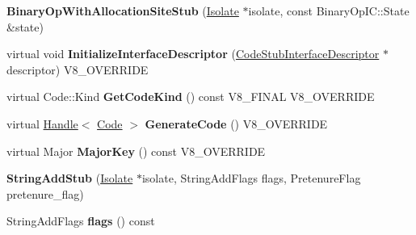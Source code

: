 \begin{DoxyCompactItemize}
\item 
\hypertarget{classv8_1_1internal_1_1_v8___f_i_n_a_l_af99197dd75c9312e4233a4390ea899fe}{}{\bfseries Binary\+Op\+With\+Allocation\+Site\+Stub} (\hyperlink{classv8_1_1internal_1_1_isolate}{Isolate} $\ast$isolate, const Binary\+Op\+I\+C\+::\+State \&state)\label{classv8_1_1internal_1_1_v8___f_i_n_a_l_af99197dd75c9312e4233a4390ea899fe}

\item 
\hypertarget{classv8_1_1internal_1_1_v8___f_i_n_a_l_aedb89fb967acc9802a2789257d456f13}{}virtual void {\bfseries Initialize\+Interface\+Descriptor} (\hyperlink{classv8_1_1internal_1_1_code_stub_interface_descriptor}{Code\+Stub\+Interface\+Descriptor} $\ast$descriptor) V8\+\_\+\+O\+V\+E\+R\+R\+I\+D\+E\label{classv8_1_1internal_1_1_v8___f_i_n_a_l_aedb89fb967acc9802a2789257d456f13}

\item 
\hypertarget{classv8_1_1internal_1_1_v8___f_i_n_a_l_ad00c36d4d9cb97213ceffe5f530c9e08}{}virtual Code\+::\+Kind {\bfseries Get\+Code\+Kind} () const V8\+\_\+\+F\+I\+N\+A\+L V8\+\_\+\+O\+V\+E\+R\+R\+I\+D\+E\label{classv8_1_1internal_1_1_v8___f_i_n_a_l_ad00c36d4d9cb97213ceffe5f530c9e08}

\item 
\hypertarget{classv8_1_1internal_1_1_v8___f_i_n_a_l_a0ed5719f94df27f3b0c610b0a4934a70}{}virtual \hyperlink{classv8_1_1internal_1_1_handle}{Handle}$<$ \hyperlink{classv8_1_1internal_1_1_code}{Code} $>$ {\bfseries Generate\+Code} () V8\+\_\+\+O\+V\+E\+R\+R\+I\+D\+E\label{classv8_1_1internal_1_1_v8___f_i_n_a_l_a0ed5719f94df27f3b0c610b0a4934a70}

\item 
\hypertarget{classv8_1_1internal_1_1_v8___f_i_n_a_l_ae50db15936b838b4fcfbc1995bf37ad5}{}virtual Major {\bfseries Major\+Key} () const V8\+\_\+\+O\+V\+E\+R\+R\+I\+D\+E\label{classv8_1_1internal_1_1_v8___f_i_n_a_l_ae50db15936b838b4fcfbc1995bf37ad5}

\item 
\hypertarget{classv8_1_1internal_1_1_v8___f_i_n_a_l_aeaee7053f5c55851262b09485b8de870}{}{\bfseries String\+Add\+Stub} (\hyperlink{classv8_1_1internal_1_1_isolate}{Isolate} $\ast$isolate, String\+Add\+Flags flags, Pretenure\+Flag pretenure\+\_\+flag)\label{classv8_1_1internal_1_1_v8___f_i_n_a_l_aeaee7053f5c55851262b09485b8de870}

\item 
\hypertarget{classv8_1_1internal_1_1_v8___f_i_n_a_l_a108bef9f093ff04e5ea9c0d9644aa6bc}{}String\+Add\+Flags {\bfseries flags} () const \label{classv8_1_1internal_1_1_v8___f_i_n_a_l_a108bef9f093ff04e5ea9c0d9644aa6bc}


\end{DoxyCompactItemize}
